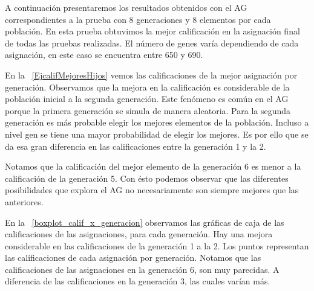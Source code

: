 A continuación presentaremos los resultados obtenidos con el AG correspondientes a la prueba con 8 generaciones y 8 elementos por cada población. En esta prueba obtuvimos la mejor calificación en la asignación final de todas las pruebas realizadas. El número de genes varía dependiendo de cada asignación, en este caso se encuentra entre 650 y 690.


En la \figurename{~\ref{EjcalifMejoresHijos}} vemos las calificaciones de la mejor asignación por generación. Observamos que la mejora en la calificación es considerable de la población inicial a la segunda generación. Este fenómeno es común en el AG porque la primera generación se simula de manera aleatoria. Para la segunda generación es más probable elegir los mejores elementos de la población. Incluso a nivel gen se tiene una mayor probabilidad de elegir los mejores. Es por ello que se da esa gran diferencia en las calificaciones entre la generación 1 y la 2.

Notamos que la calificación del mejor elemento de la generación 6 es menor a la calificación de la generación 5. Con ésto podemos observar que las diferentes posibilidades que explora el AG no necesariamente son siempre mejores que las anteriores.



En la \figurename{~\ref{boxplot_calif_x_generacion}} observamos las gráficas de caja de las calificaciones de las asignaciones, para cada generación. Hay una mejora considerable en las calificaciones de la generación 1 a la 2. Los puntos representan las calificaciones de cada asignación por generación. Notamos que las calificaciones de las asignaciones en la generación 6, son muy parecidas. A diferencia de las calificaciones en la generación 3, las cuales varían más.


